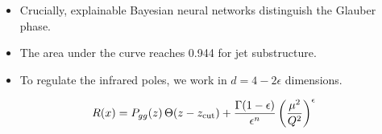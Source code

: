 \begin{itemize}
  \item Crucially, explainable Bayesian neural networks distinguish the Glauber phase.
  \item The area under the curve reaches 0.944 for jet substructure.
  \item To regulate the infrared poles, we work in $d = 4 - 2\epsilon$ dimensions.
\end{itemize}

\begin{equation}
  R(x) = P_{gg}(z) \, \Theta(z - z_{\rm cut}) + \frac{\Gamma(1-\epsilon)}{\epsilon^{n}} \left(\frac{\mu^2}{Q^2}\right)^{\epsilon}
  \label{eq:6}
\end{equation}

